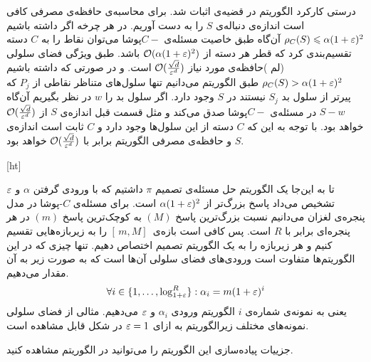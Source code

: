 درستی کارکرد الگوریتم در قضیه‌ی  اثبات شد. برای محاسبه‌ی حافظه‌ی مصرفی کافی است اندازه‌ی دنباله‌ی $S$ را به دست آوریم.
در هر چرخه اگر داشته باشیم
$ \rho_C(S) \leqslant \alpha (1 + \varepsilon) ^ 2 $
آن‌گاه طبق خاصیت مسئله‌ی $C-$پوشا می‌توان نقاط را به $C$ دسته تقسیم‌بندی کرد که قطر هر دسته از 
$\mathcal{O}( \alpha (1 + \varepsilon)^2)$
باشد. طبق ویژگی فضای سلولی (لم 
)حافظه‌ی مورد نیاز 
$\mathcal{O}(\frac{\sqrt{d}}{\varepsilon^d})$
است.
و در صورتی که داشته باشیم
$ \rho_C(S) > \alpha (1 + \varepsilon) ^ 2 $ 
طبق الگوریتم می‌دانیم تنها سلول‌های متناظر نقاطی از $P_j$ که پیرتر از سلول بد $S_j$ نیستند در $S$ وجود دارد. اگر سلول‌ بد را $w$ در نظر بگیریم آن‌گاه $S-w$ در مسئله‌ی $C-$پوشا صدق می‌کند و مثل قسمت قبل اندازه‌ی $S$ از 
$\mathcal{O}(\frac{\sqrt{d}}{\varepsilon^d})$
خواهد بود. با توجه به این که $C$ دسته از این سلول‌ها وجود دارد و $C$ ثابت است اندازه‌ی $S$ و حافظه‌ی مصرفی الگوریتم برابر با
$\mathcal{O}(\frac{\sqrt{d}}{\varepsilon^d})$
خواهد بود.

[ht]

تا به این‌جا یک الگوریتم حل مسئله‌ی تصمیم $\pi$ داشتیم که با ورودی گرفتن $\alpha$ و $\varepsilon$ تشخیص می‌داد پاسخ بزرگ‌تر از $\alpha (1+\varepsilon)^2$ است. برای مسئله‌ی $C$-پوشا در مدل پنجره‌ی لغزان می‌دانیم نسبت بزرگ‌ترین پاسخ $(M)$ به کوچک‌ترین پاسخ $(m)$ در هر پنجره‌ای برابر با $R$ است. پس کافی است بازه‌ی 
$ [\, m, M]\,$
را به زیربازه‌هایی تقسیم کنیم و هر زیربازه را به یک الگوریتم تصمیم اختصاص دهیم. تنها چیزی که در این الگوریتم‌ها متفاوت است ورودی‌های فضای سلولی آن‌ها است که به صورت زیر به آن مقدار می‌دهیم.
$$ \forall i \in  \{1, \ldots, \log_{1+\varepsilon}^{R} \}: \alpha_i = m  (1+\varepsilon)^i$$
یعنی به نمونه‌ی شماره‌ی $i$  الگوریتم  ورودی $\alpha_i$ و $\varepsilon$ می‌دهیم. مثالی از فضای سلولی نمونه‌های مختلف زیرالگوریتم به ازای $\varepsilon = 1$ در شکل  قابل مشاهده است.


جزییات پیاده‌سازی این الگوریتم را می‌توانید در الگوریتم  مشاهده کنید.

